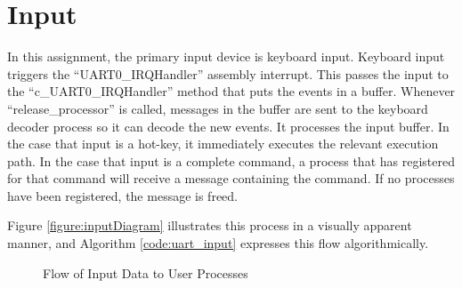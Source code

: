 \documentclass[12pt]{report}
\begin{document}
\section{Input}
\label{sec:Input}
    In this assignment, the primary input device is keyboard input.
    Keyboard input triggers the ``UART0\_IRQHandler'' assembly interrupt. This
    passes the input to the ``c\_UART0\_IRQHandler'' method that puts the events
    in a buffer. Whenever ``release\_processor'' is called, messages in the
    buffer are sent to the keyboard decoder process so it can decode the new
    events. It processes the input buffer. In the case that input is a hot-key,
    it immediately executes the relevant execution path. In the case that input
    is a complete command, a process that has registered for that command will
    receive a message containing the command. If no processes have been
    registered, the message is freed.

    Figure \ref{figure:inputDiagram} illustrates this process in a visually
    apparent manner, and Algorithm \ref{code:uart_input} expresses this flow
    algorithmically.

    \begin{figure}
        \centering

        \caption{Flow of Input Data to User Processes}
    \end{figure}
\end{document}
